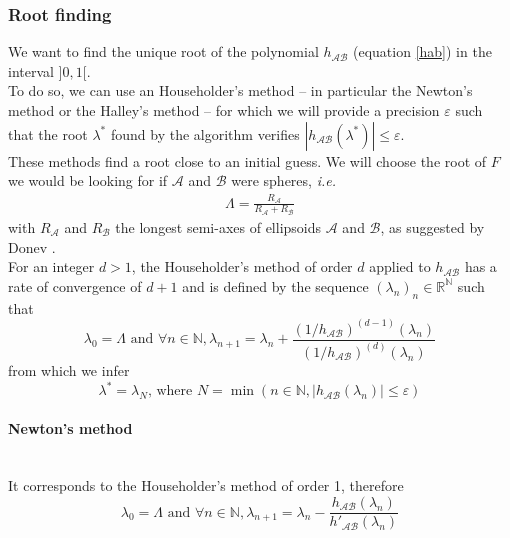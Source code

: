\documentclass[class=report, float=false, crop=false]{standalone}
\begin{document}
\subsubsection{Root finding}

We want to find the unique root of the polynomial $h_{\mathcal{A}\mathcal{B}}$ (equation \ref{hab}) in the interval $]0,1[$.\\

To do so, we can use an Householder's method -- in particular the Newton's method or the Halley's method -- for which we will provide a precision $\varepsilon$ such that the root $\lambda^*$ found by the algorithm verifies $|h_{\mathcal{A}\mathcal{B}}(\lambda^*)| \leq \varepsilon$.\\

These methods find a root close to an initial guess. We will choose the root of $F$ we would be looking for if $\mathcal{A}$ and $\mathcal{B}$ were spheres, \textit{i.e.}
\begin{align*}
\Lambda = \frac{R_{\mathcal{A}}}{R_{\mathcal{A}} + R_{\mathcal{B}}}
\end{align*}
with $R_{\mathcal{A}}$ and $R_{\mathcal{B}}$ the longest semi-axes of ellipsoids $\mathcal{A}$ and $\mathcal{B}$, as suggested by Donev \cite{donev}.\\

For an integer $d > 1$, the Householder's method of order $d$ applied to $h_{\mathcal{A}\mathcal{B}}$ has a rate of convergence of $d+1$ and is defined by the sequence $(\lambda_n)_n \in \mathbb{R}^{\mathbb{N}}$ such that
\begin{equation}
\lambda_0 = \Lambda \text{ and } \forall n \in \mathbb{N}, \lambda_{n+1} = \lambda_n + \frac{(1/h_{\mathcal{A}\mathcal{B}})^{(d-1)}(\lambda_n)}{(1/h_{\mathcal{A}\mathcal{B}})^{(d)}(\lambda_n)}
\end{equation}
from which we infer
\begin{equation}
\lambda^* = \lambda_N \text{, where } N = \min(n \in \mathbb{N}, |h_{\mathcal{A}\mathcal{B}}(\lambda_n)| \leq \varepsilon)
\end{equation}

\paragraph{Newton's method}\mbox{}\\

It corresponds to the Householder's method of order 1, therefore
\begin{equation}
\lambda_0 = \Lambda \text{ and } \forall n \in \mathbb{N}, \lambda_{n+1} = \lambda_n - \frac{h_{\mathcal{A}\mathcal{B}}(\lambda_n)}{h'_{\mathcal{A}\mathcal{B}}(\lambda_n)}
\end{equation}
\end{document}
